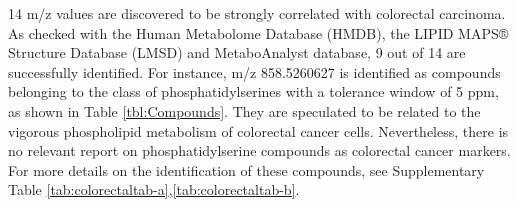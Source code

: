 \documentclass{WileyMSP-template}
\begin{document}
  




14 m/z values are discovered to be 
strongly correlated with colorectal carcinoma. 
As checked with the Human Metabolome Database (HMDB), 
the LIPID MAPS® Structure Database (LMSD) 
and MetaboAnalyst database, 
9 out of 14 are successfully identified. For instance, m/z 858.5260627 
is identified as compounds belonging to the class of phosphatidylserines 
with a  tolerance window of 5 ppm, as shown in Table \ref{tbl:Compounds}. 
They are speculated to be related 
to the vigorous phospholipid metabolism of colorectal cancer cells. Nevertheless, 
there is no relevant report on phosphatidylserine compounds as colorectal cancer markers. 
For more details on the identification of these compounds, 
see Supplementary Table \ref{tab:colorectaltab-a},\ref{tab:colorectaltab-b}.
\end{document}
